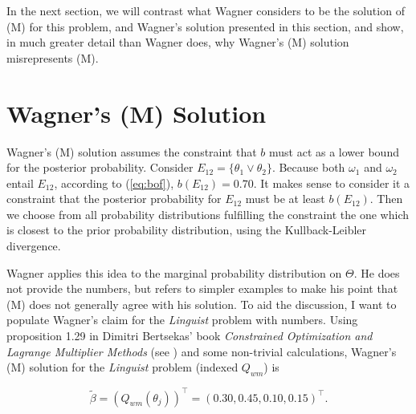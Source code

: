 \documentclass[11pt]{article}
\begin{document}
In the next section, we will contrast what Wagner considers to be the
solution of (M) for this problem,  and
Wagner's solution presented in this section,  and show, in much greater detail than Wagner does, why
Wagner's (M) solution misrepresents (M).

\section{Wagner's (M) Solution}
\label{WagnersMSolution}

Wagner's (M) solution assumes the constraint that $b$ must act as a
lower bound for the posterior probability. Consider
$E_{12}=\{\theta_{1}\vee\theta_{2}\}$. Because both $\omega_{1}$ and
$\omega_{2}$ entail $E_{12}$, according to (\ref{eq:bof}),
$b(E_{12})=0.70$. It makes sense to consider it a constraint that the
posterior probability for $E_{12}$ must be at least $b(E_{12})$. Then
we choose from all probability distributions fulfilling the constraint
the one which is closest to the prior probability distribution, using
the Kullback-Leibler divergence.

Wagner applies this idea to the marginal probability distribution on
$\Theta$. He does not provide the numbers, but refers to simpler
examples to make his point that (M) does not generally agree with his
solution. To aid the discussion, I want to populate Wagner's claim for
the \emph{Linguist} problem with numbers. Using proposition 1.29 in
Dimitri Bertsekas' book \emph{Constrained Optimization and Lagrange
  Multiplier Methods} (see ) and some
non-trivial calculations, Wagner's (M) solution for the
\emph{Linguist} problem (indexed $Q_{wm}$) is

\begin{equation}
  \label{eq:p13}
  \tilde{\beta}=(Q_{wm}(\theta_{j}))^{\intercal}=(0.30,0.45,0.10,0.15)^{\intercal}.
\end{equation}

\end{document}
